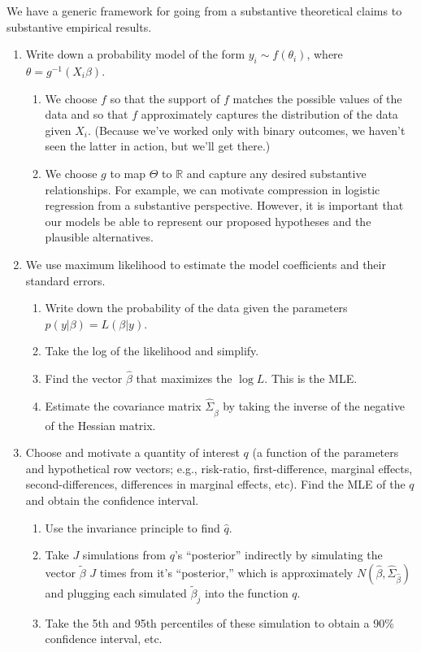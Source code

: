 \documentclass[12pt]{article}
\begin{document}
We have a generic framework for going from a substantive theoretical claims to substantive empirical results.
\begin{enumerate}
\item Write down a probability model of the form $y_i \sim f(\theta_i)$, where $\theta = g^{-1}(X_i\beta)$.
	\begin{enumerate}
	\item We choose $f$ so that the support of $f$ matches the possible values of the data and so that $f$ approximately captures the distribution of the data given $X_i$. (Because we've worked only with binary outcomes, we haven't seen the latter in action, but we'll get there.)
	\item We choose $g$ to map $\Theta$ to $\mathbb{R}$ and capture any desired substantive relationships. For example, we can motivate compression in logistic regression from a substantive perspective. However, it is important that our models be able to represent our proposed hypotheses and the plausible alternatives.
	\end{enumerate}
\item We use maximum likelihood to estimate the model coefficients and their standard errors.
	\begin{enumerate}
	\item Write down the probability of the data given the parameters $p(y | \beta) = L(\beta | y)$.
	\item Take the log of the likelihood and simplify.
	\item Find the vector $\hat{\beta}$ that maximizes the $\log L$. This is the MLE.
	\item Estimate the covariance matrix $\hat{\Sigma}_{\hat{\beta}}$ by taking the inverse of the negative of the Hessian matrix.
	\end{enumerate}
\item Choose and motivate a quantity of interest $q$ (a function of the parameters and hypothetical row vectors; e.g., risk-ratio, first-difference, marginal effects, second-differences, differences in marginal effects, etc). Find the MLE of the $q$ and obtain the confidence interval.
	\begin{enumerate}
	\item Use the invariance principle to find $\hat{q}$.
	\item Take $J$ simulations from $q$'s ``posterior'' indirectly by simulating the vector $\tilde{\beta}$ $J$ times from it's ``posterior,'' which is approximately $N(\hat{\beta}, \hat{\Sigma}_{\hat{\beta}})$ and plugging each simulated $\tilde{\beta}_j$ into the function $q$.
	\item Take the 5th and 95th percentiles of these simulation to obtain a 90\% confidence interval, etc.
	\end{enumerate}
\end{enumerate}
\end{document}
